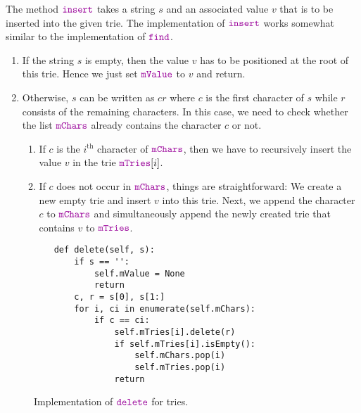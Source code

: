 The method $\mytt{insert}$ takes a string $s$ and an associated value $v$ that is to be inserted
into the given trie.  The implementation of $\mytt{insert}$ works somewhat similar to the
implementation of $\mytt{find}$.
\begin{enumerate}
\item If the string $s$ is empty, then the value $v$ has to be positioned at the root of this trie.
      Hence we just set $\mytt{mValue}$ to $v$ and return.
\item Otherwise, $s$ can be written as $cr$ where $c$ is the first character of $s$ while $r$
      consists of the remaining characters.  In this case, we need to check whether the list
      $\mytt{mChars}$ already contains the character $c$ or not.
      \begin{enumerate}
      \item If $c$ is the $i^\textrm{th}$ character of $\mytt{mChars}$, then we have to recursively insert the value $v$
            in the trie $\mytt{mTries}[i]$.  
      \item If $c$ does not occur in $\mytt{mChars}$, things are straightforward: We create a new
            empty trie and insert $v$ into this trie.  Next, we append the character $c$ to
            $\mytt{mChars}$ and simultaneously append the newly created trie that contains $v$ to
            $\mytt{mTries}$. 
      \end{enumerate}
\end{enumerate}

\begin{figure}[!ht]
\centering
\begin{verbatim}
    def delete(self, s):
        if s == '':
            self.mValue = None
            return
        c, r = s[0], s[1:]
        for i, ci in enumerate(self.mChars):
            if c == ci:
                self.mTries[i].delete(r)
                if self.mTries[i].isEmpty():
                    self.mChars.pop(i)
                    self.mTries.pop(i)
                return
\end{verbatim}
\vspace*{-0.3cm}
\caption{Implementation of $\mytt{delete}$ for tries.}
\label{fig:trie.ipython-delete}
\end{figure}

